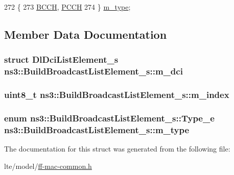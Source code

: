 \begin{DoxyCode}
272   \{
273     \hyperlink{structns3_1_1BuildBroadcastListElement__s_a001a655a4792c620274db8f163701259a7a89d120da2ddb997e54fb1497df8719}{BCCH}, \hyperlink{structns3_1_1BuildBroadcastListElement__s_a001a655a4792c620274db8f163701259a372701c3cdf6f7120663eac8f6897546}{PCCH}
274   \} \hyperlink{structns3_1_1BuildBroadcastListElement__s_aea7882b9468183667c016fe2741148a9}{m\_type};
\end{DoxyCode}


\subsection{Member Data Documentation}
\subsubsection[{\texorpdfstring{m\+\_\+dci}{m_dci}}]{\setlength{\rightskip}{0pt plus 5cm}struct {\bf Dl\+Dci\+List\+Element\+\_\+s} ns3\+::\+Build\+Broadcast\+List\+Element\+\_\+s\+::m\+\_\+dci}\hypertarget{structns3_1_1BuildBroadcastListElement__s_ae71037f2f42f0e168160463ab8104e78}{}\label{structns3_1_1BuildBroadcastListElement__s_ae71037f2f42f0e168160463ab8104e78}
\subsubsection[{\texorpdfstring{m\+\_\+index}{m_index}}]{\setlength{\rightskip}{0pt plus 5cm}uint8\+\_\+t ns3\+::\+Build\+Broadcast\+List\+Element\+\_\+s\+::m\+\_\+index}\hypertarget{structns3_1_1BuildBroadcastListElement__s_a70151e699801c1d93c1a98956b46ff30}{}\label{structns3_1_1BuildBroadcastListElement__s_a70151e699801c1d93c1a98956b46ff30}
\subsubsection[{\texorpdfstring{m\+\_\+type}{m_type}}]{\setlength{\rightskip}{0pt plus 5cm}enum {\bf ns3\+::\+Build\+Broadcast\+List\+Element\+\_\+s\+::\+Type\+\_\+e}  ns3\+::\+Build\+Broadcast\+List\+Element\+\_\+s\+::m\+\_\+type}\hypertarget{structns3_1_1BuildBroadcastListElement__s_aea7882b9468183667c016fe2741148a9}{}\label{structns3_1_1BuildBroadcastListElement__s_aea7882b9468183667c016fe2741148a9}


The documentation for this struct was generated from the following file\+:\begin{DoxyCompactItemize}
\item 
lte/model/\hyperlink{ff-mac-common_8h}{ff-\/mac-\/common.\+h}\end{DoxyCompactItemize}
